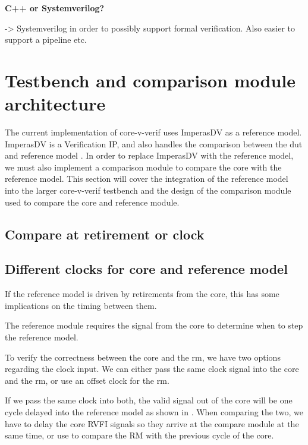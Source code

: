 \textbf{C++ or Systemverilog?}

-> Systemverilog in order to possibly support formal verification.
Also easier to support a pipeline etc.


\section{Testbench and comparison module architecture}

The current implementation of core-v-verif uses ImperasDV as a reference model. ImperasDV is a Verification IP, and also handles the comparison between the \acrshort{dut} and reference model \cite{imperassoftwareltdRISCVProcessorOVP2023}. In order to replace ImperasDV with the reference model, we must also implement a comparison module to compare the core with the reference model. This section will cover the integration of the reference model into the larger \gls{core-v-verif} testbench and the design of the comparison module used to compare the core and reference module.

\subsection{Compare at retirement or clock}




\subsection{Different clocks for core and reference model}

If the reference model is driven by retirements from the core, this has some implications on the timing between them.

The reference module requires the  signal from the core to determine when to step the reference model.

To verify the correctness between the core and the \acrshort{rm}, we have two options regarding the clock input. We can either pass the same clock signal into the core and the \acrshort{rm}, or use an offset clock for the \acrshort{rm}.

If we pass the same clock into both, the valid signal out of the core will be one cycle delayed into the reference model as shown in . When comparing the two, we have to delay the core RVFI signals so they arrive at the compare module at the same time, or use  to compare the RM with the previous cycle of the core.

